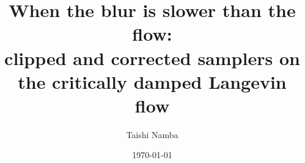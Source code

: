 \documentclass[aps,pre,twocolumn,superscriptaddress,nofootinbib]{revtex4-2}
\begin{document}
\title{\texorpdfstring{When the blur is slower than the flow:\\ clipped and corrected samplers on the critically damped Langevin flow}{When the blur is slower than the flow: clipped and corrected samplers on the critically damped Langevin flow}}

\author{Taishi Namba}

\date{\today}

\begin{abstract}

\end{abstract}

\maketitle










\appendix




\end{document}
